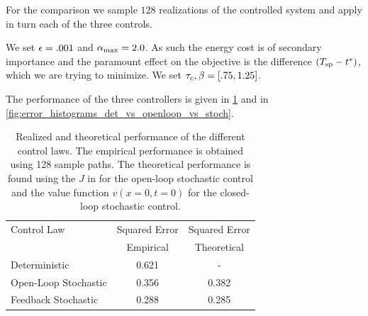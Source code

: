 \documentclass{article}
\begin{document}
For the comparison we sample $128$ realizations of the controlled system
and apply in turn each of the three controls.

We set ${\epsilon} = .001$ and ${ {\alpha}_{\textrm{max}} } = 2.0$. As such the energy cost is of
secondary importance and the paramount effect on the objective is the difference
$({ T_{\textrm{sp} } } - { t^* })$, which we are trying to minimize. We set ${ \tau_{c} }, {\beta} = [.75, 1.25]$.

The performance of the three controllers is given in
\cref{tab:realized_avg_errors_det_vs_openloop_vs_stoch} and in
\cref{fig:error_histograms_det_vs_openloop_vs_stoch}.


\begin{table}[h] 
\centering
\begin{tabular}{lcc}
Control Law & Squared Error &  Squared Error \\
 & Empirical & Theoretical\\
\hline
Deterministic &  0.621 & - \\
Open-Loop Stochastic & 0.356 & 0.382\\
Feedback Stochastic &  0.288& 0.285\\
\hline
\end{tabular}
\caption{Realized and theoretical performance of the different control laws. The empirical
performance is obtained using 128 sample paths. The theoretical performance is
found using the $J$ in for the open-loop stochastic control and the value
function $v(x=0, t =0)$ for the closed-loop stochastic control.}
\label{tab:realized_avg_errors_det_vs_openloop_vs_stoch}
\end{table}
\end{document}
